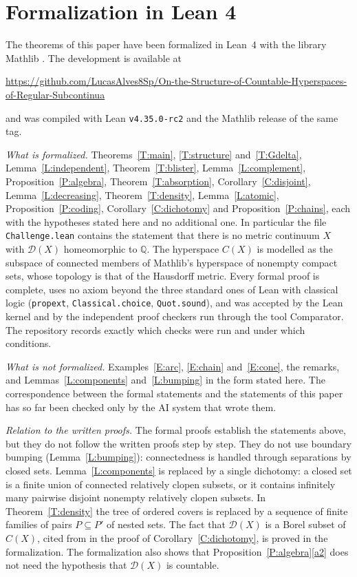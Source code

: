 \documentclass[11pt,reqno]{amsart}
\theoremstyle{plain}
\theoremstyle{definition}
\theoremstyle{remark}
\newcommand{\D}{\mathcal{D}}
\newcommand{\Q}{\mathbb{Q}}
\begin{document}
\section*{Formalization in Lean 4}

The theorems of this paper have been formalized in Lean~4 \cite{Lean4} with the library Mathlib \cite{Mathlib}. The development is available at
\begin{center}
\url{https://github.com/LucasAlves8Sp/On-the-Structure-of-Countable-Hyperspaces-of-Regular-Subcontinua}
\end{center}
and was compiled with Lean \texttt{v4.35.0-rc2} and the Mathlib release of the same tag.

\emph{What is formalized.} Theorems~\ref{T:main}, \ref{T:structure} and~\ref{T:Gdelta}, Lemma~\ref{L:independent}, Theorem~\ref{T:blister}, Lemma~\ref{L:complement}, Proposition~\ref{P:algebra}, Theorem~\ref{T:absorption}, Corollary~\ref{C:disjoint}, Lemma~\ref{L:decreasing}, Theorem~\ref{T:density}, Lemma~\ref{L:atomic}, Proposition~\ref{P:coding}, Corollary~\ref{C:dichotomy} and Proposition~\ref{P:chains}, each with the hypotheses stated here and no additional one. In particular the file \texttt{Challenge.lean} contains the statement that there is no metric continuum $X$ with $\D(X)$ homeomorphic to $\Q$. The hyperspace $C(X)$ is modelled as the subspace of connected members of Mathlib's hyperspace of nonempty compact sets, whose topology is that of the Hausdorff metric. Every formal proof is complete, uses no axiom beyond the three standard ones of Lean with classical logic (\texttt{propext}, \texttt{Classical.choice}, \texttt{Quot.sound}), and was accepted by the Lean kernel and by the independent proof checkers run through the tool Comparator. The repository records exactly which checks were run and under which conditions.

\emph{What is not formalized.} Examples~\ref{E:arc}, \ref{E:chain} and~\ref{E:cone}, the remarks, and Lemmas~\ref{L:components} and~\ref{L:bumping} in the form stated here. The correspondence between the formal statements and the statements of this paper has so far been checked only by the AI system that wrote them.

\emph{Relation to the written proofs.} The formal proofs establish the statements above, but they do not follow the written proofs step by step. They do not use boundary bumping (Lemma~\ref{L:bumping}): connectedness is handled through separations by closed sets. Lemma~\ref{L:components} is replaced by a single dichotomy: a closed set is a finite union of connected relatively clopen subsets, or it contains infinitely many pairwise disjoint nonempty relatively clopen subsets. In Theorem~\ref{T:density} the tree of ordered covers is replaced by a sequence of finite families of pairs $P\subseteq P'$ of nested sets. The fact that $\D(X)$ is a Borel subset of $C(X)$, cited from \cite{Ram23} in the proof of Corollary~\ref{C:dichotomy}, is proved in the formalization. The formalization also shows that Proposition~\ref{P:algebra}\ref{a2} does not need the hypothesis that $\D(X)$ is countable.
\end{document}
